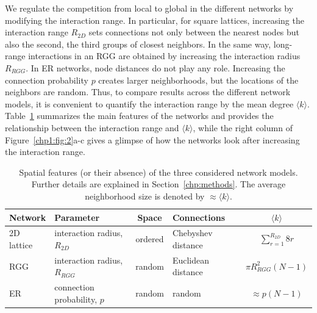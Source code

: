 We regulate the competition from local to global in the different networks by modifying the interaction range. In particular, for square lattices, increasing the interaction range $R_{2D}$ sets connections not only between the nearest nodes but also the second, the third groups of closest neighbors. In the same way, long-range interactions in an RGG are obtained by increasing the interaction radius $R_{RGG}$. In ER networks, node distances do not play any role. Increasing the connection probability $p$ creates larger neighborhoods, but the locations of the neighbors are random. Thus, to compare results across the different network models, it is convenient to quantify the interaction range by the mean degree $\langle k \rangle$. Table~\ref{chp1:tab:1} summarizes the main features of the networks and provides the relationship between the interaction range and $\langle k \rangle$, while the right column of Figure~\ref{chp1:fig:2}a-c gives a glimpse of how the networks look after increasing the interaction range.

\begin{table}[t]
\centering
\caption[Spatial features of network models]{Spatial features (or their absence) of the three considered network models. Further details are explained in Section~\ref{chp:methods}. The average neighborhood size is denoted by $\approx \langle k \rangle$.}
\label{chp1:tab:1}
\begin{tabularx}{\textwidth}{X X c X c}
\hline
\textbf{Network}    &\textbf{Parameter}  &  \textbf{Space}  & \textbf{Connections} & \textbf{$ \langle k \rangle$} \\ \hline \hline
2D lattice & interaction radius, $R_{2D}$  &   ordered     & Chebyshev distance  & $\sum_{r = 1}^{R_{2D}} 8 r$              \\ \hline
RGG        &  interaction radius, $R_{RGG}$  & random    & Euclidean distance  & $\pi R_{RGG}^2(N-1)$                \\ \hline
ER         &    connection probability, $p$   & random & random              & $\approx p(N-1)$  \\
\hline
\end{tabularx}
\end{table}

